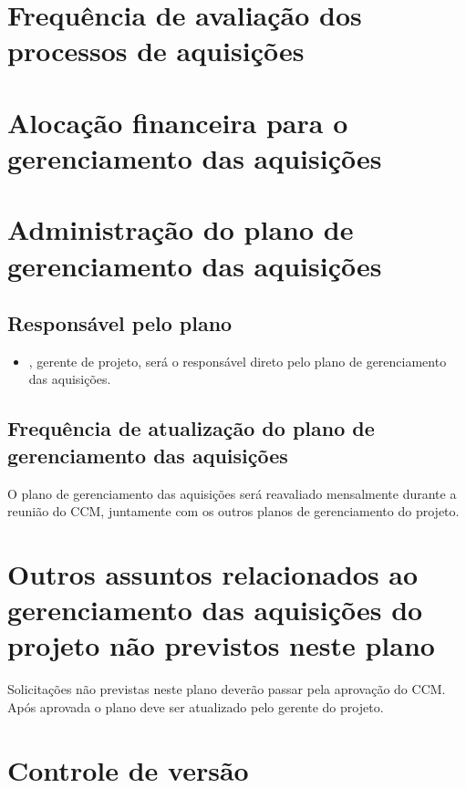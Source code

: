 \section{Frequência de avaliação dos processos de aquisições}


\section{Alocação financeira para o gerenciamento das aquisições}


\section{Administração do plano de gerenciamento das aquisições}

\subsection{Responsável pelo plano}

\begin{itemize}
	\item \projectManagerName{}, gerente de projeto, será o responsável direto pelo plano de gerenciamento das aquisições.
\end{itemize}

\subsection{Frequência de atualização do plano de gerenciamento das aquisições}

O plano de gerenciamento das aquisições será reavaliado mensalmente durante a reunião do CCM, juntamente com os outros planos de gerenciamento do projeto.

\section{Outros assuntos relacionados ao gerenciamento das aquisições do projeto não previstos neste plano}

Solicitações não previstas neste plano deverão passar pela aprovação do CCM. Após aprovada o plano deve ser atualizado pelo gerente do projeto.

\section{Controle de versão}

